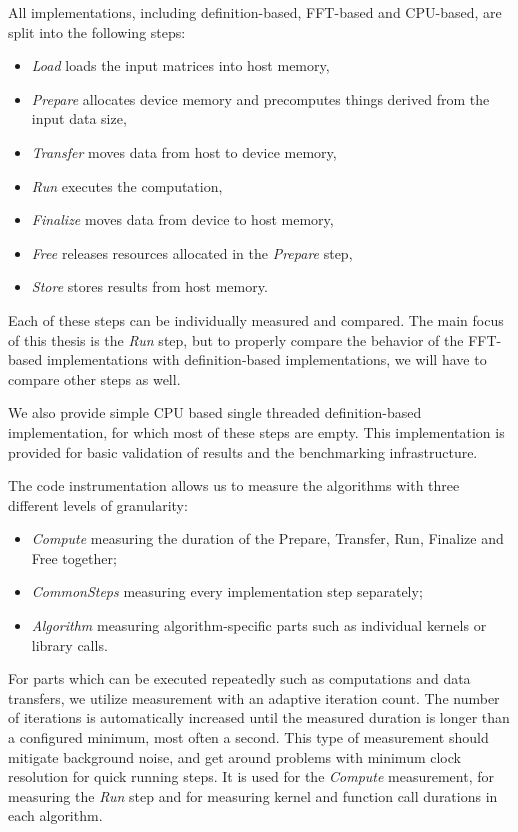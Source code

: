 All implementations, including definition-based, FFT-based and CPU-based, are split into the following steps:

\begin{itemize}
	\item \textit{Load} loads the input matrices into host memory,
	\item \textit{Prepare} allocates device memory and precomputes things derived from the input data size,
	\item \textit{Transfer} moves data from host to device memory,
	\item \textit{Run} executes the computation,
	\item \textit{Finalize} moves data from device to host memory,
	\item \textit{Free} releases resources allocated in the \textit{Prepare} step,
	\item \textit{Store} stores results from host memory.
\end{itemize}

Each of these steps can be individually measured and compared. The main focus of this thesis is the \textit{Run} step, but to properly compare the behavior of the FFT-based implementations with definition-based implementations, we will have to compare other steps as well.

We also provide simple CPU based single threaded definition-based implementation, for which most of these steps are empty. This implementation is provided for basic validation of results and the benchmarking infrastructure. 


The code instrumentation allows us to measure the algorithms with three different levels of granularity:
\begin{itemize}
	\item \textit{Compute} measuring the duration of the Prepare, Transfer, Run, Finalize and Free together;
	\item \textit{CommonSteps} measuring every implementation step separately;
	\item \textit{Algorithm} measuring algorithm-specific parts such as individual kernels or library calls.
\end{itemize}

For parts which can be executed repeatedly such as computations and data transfers, we utilize measurement with an adaptive iteration count. The number of iterations is automatically increased until the measured duration is longer than a configured minimum, most often a second. This type of measurement should mitigate background noise, and get around problems with minimum clock resolution for quick running steps. It is used for the \textit{Compute} measurement, for measuring the \textit{Run} step and for measuring kernel and function call durations in each algorithm.


